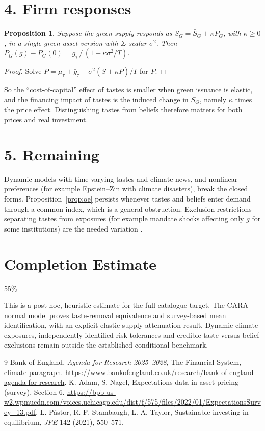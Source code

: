 \documentclass[11pt]{article}
\newtheorem{proposition}[theorem]{Proposition}
\theoremstyle{definition}
\begin{document}
\section*{4. Firm responses}
\begin{proposition}\label{prop:supply}
Suppose the green supply responds as $S_G=\bar S_G+\kappa P_G$, with $\kappa\ge0$, in a single-green-asset version with
$\Sigma$ scalar $\sigma^2$. Then $P_G(g)-P_G(0)=\bar g_\tau\,/\,(1+\kappa\sigma^2/T)$.
\end{proposition}
\begin{proof}
Solve $P=\bar\mu_\tau+\bar g_\tau-\sigma^2(\bar S+\kappa P)/T$ for $P$.
\end{proof}
So the ``cost-of-capital'' effect of tastes is smaller when green issuance is elastic, and the financing impact of tastes is
the induced change in $S_G$, namely $\kappa$ times the price effect. Distinguishing tastes from beliefs therefore matters
for both prices and real investment.

\section*{5. Remaining}
Dynamic models with time-varying tastes and climate news, and nonlinear preferences (for example Epstein--Zin with climate
disasters), break the closed forms. Proposition~\ref{prop:oe} persists whenever tastes and beliefs enter demand through a
common index, which is a general obstruction. Exclusion restrictions separating tastes from exposures (for example
mandate shocks affecting only $g$ for some institutions) are the needed variation \cite{boe,an}.

\section{Completion Estimate}
55\%

This is a post hoc, heuristic estimate for the full catalogue target.
The CARA-normal model proves taste-removal equivalence and survey-based mean identification, with an explicit elastic-supply attenuation result. Dynamic climate exposures, independently identified risk tolerances and credible taste-versus-belief exclusions remain outside the established conditional benchmark.

\begin{thebibliography}{9}
 Bank of England, \emph{Agenda for Research 2025--2028}, The Financial System, climate paragraph. \url{https://www.bankofengland.co.uk/research/bank-of-england-agenda-for-research}.
 K. Adam, S. Nagel, Expectations data in asset pricing (survey), Section 6.
\url{https://bpb-us-w2.wpmucdn.com/voices.uchicago.edu/dist/f/575/files/2022/01/ExpectationsSurvey_13.pdf}.
 L. P\'astor, R. F. Stambaugh, L. A. Taylor, Sustainable investing in equilibrium, \emph{JFE} 142 (2021), 550--571.
\end{thebibliography}
\end{document}

